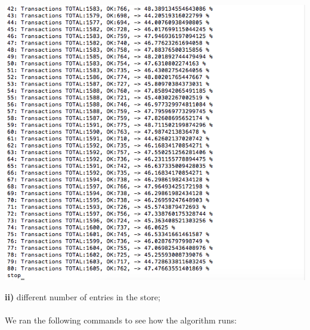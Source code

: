 \documentclass[a4paper, 11pt]{article}
\begin{document}
\begin{itemize}
\includegraphics[scale=0.4]{images/exp-i-6b.png} \\
\end{itemize}
\newpage
%
\textbf{ii)} different number of entries in the store;\\\\
We ran the following commands to see how the algorithm runs:\\
\end{document}
